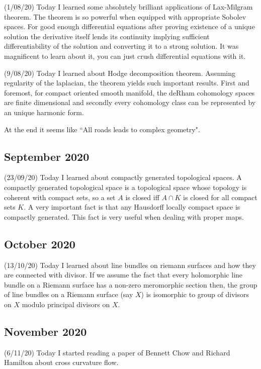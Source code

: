 \documentclass[12pt,a4paper]{article}
\begin{document}
\quad (1/08/20) Today I learned some absolutely brilliant applications of Lax-Milgram theorem. The theorem is so powerful when equipped with appropriate Sobolev spaces. For good enough differential equations after proving existence of a unique solution the derivative itself lends its continuity implying sufficient differentiability of the solution and converting it to a strong solution. It was magnificent to learn about it, you can just crush differential equations with it.

(9/08/20) Today I learned about Hodge decomposition theorem. Assuming regularity of the laplacian, the theorem yields such important results. First and foremost, for compact oriented smooth manifold, the deRham cohomology spaces are finite dimensional and secondly every cohomology class can be represented by an unique harmonic form. 

At the end it seems like ``All roads leads to complex geometry".

\subsection*{September 2020}


\quad (23/09/20) Today I learned about compactly generated topological spaces. A compactly generated topological space is a topological space whose topology is coherent with compact sets, so a set $A$ is closed iff $A \cap K$ is closed for all compact sets $K$. A very important fact is that any Hausdorff locally compact space is compactly generated. This fact is very useful when dealing with proper maps. 
 
\subsection*{October 2020}


\quad (13/10/20) Today I learned about line bundles on riemann surfaces and how they are connected with divisor. If we assume the fact that every holomorphic line bundle on a Riemann surface has a non-zero meromorphic section then, the group of line bundles on a Riemann surface (say $X$) is isomorphic to group of divisors on $X$ modulo principal divisors on $X$. 

\subsection*{November 2020}


\quad (6/11/20) Today I started reading a paper of Bennett Chow and Richard Hamilton about cross curvature flow.
\end{document}
